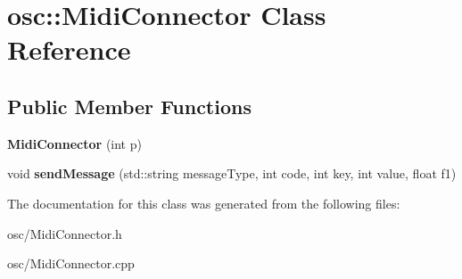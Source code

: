 \hypertarget{classosc_1_1MidiConnector}{}\section{osc\+:\+:Midi\+Connector Class Reference}
\label{classosc_1_1MidiConnector}
\subsection*{Public Member Functions}
\begin{DoxyCompactItemize}
\item 
{\bfseries Midi\+Connector} (int p)\hypertarget{classosc_1_1MidiConnector_a1629e8c842409a21dbc78258794556cc}{}\label{classosc_1_1MidiConnector_a1629e8c842409a21dbc78258794556cc}

\item 
void {\bfseries send\+Message} (std\+::string message\+Type, int code, int key, int value, float f1)\hypertarget{classosc_1_1MidiConnector_a700ee4383b29cd2bdc73f7cfc61a360e}{}\label{classosc_1_1MidiConnector_a700ee4383b29cd2bdc73f7cfc61a360e}

\end{DoxyCompactItemize}


The documentation for this class was generated from the following files\+:\begin{DoxyCompactItemize}
\item 
osc/Midi\+Connector.\+h\item 
osc/Midi\+Connector.\+cpp\end{DoxyCompactItemize}
